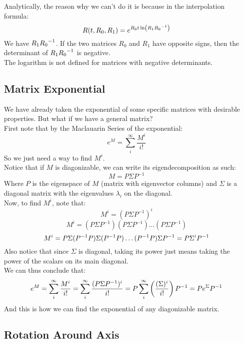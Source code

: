 \documentclass[12pt]{article}
\begin{document}
Analytically,
the reason why we can't do it is because
in the interpolation formula:
\[ R(t,R_0,R_1) = 
e^{{R_0t\ln\left( {R_1}{R_0}^{-1} \right)}} \]
We have ${R_1}{R_0}^{-1}$.
If the two matrices $R_0$ and $R_1$ have opposite
signs, then the determinant of ${R_1}{R_0}^{-1}$
is negative. \\
The logarithm is not defined for matrices
with negative determinants. \\

\newpage

\subsection*{Matrix Exponential}

We have already taken the exponential of some
specific matrices with desirable properties. 
But what if we have a general matrix? \\

First note that by the Maclauarin Series
of the exponential:
\[ e^{M} = \sum_i^\infty \dfrac{M^i}{i!} \]
So we just need a way to find $M^i$. \\

Notice that if $M$ is diagonizable,
we can write its eigendecomposition as such:
\[ M = P\Sigma P^{-1} \]
Where $P$ is the eigenspace of $M$
(matrix with eigenvector columns)
and $\Sigma$ is a diagonal matrix
with the eigenvalues $\lambda_i$
on the diagonal. \\

Now, to find $M^i$, note that:
\[ M^i = (P\Sigma P^{-1})^i \]
\[ M^i = (P\Sigma P^{-1})(P\Sigma P^{-1})\dots
(P\Sigma P^{-1})\]
\[ M^i = P\Sigma (P^{-1}P)\Sigma (P^{-1}P) \dots
(P^{-1}P)\Sigma P^{-1} = P\Sigma^i P^{-1} \]
Also notice that since $\Sigma$
is diagonal, taking its power just means
taking the power of the scalars on its main
diagonal. \\

We can thus conclude that:
\[ e^{M} = \sum_i^\infty \dfrac{M^i}{i!} 
= \sum_i^\infty \dfrac{(P\Sigma P^{-1})^i}{i!}
= P\sum_i^\infty \left( \dfrac{(\Sigma)^i}{i!} \right) P^{-1}
= Pe^{\Sigma}P^{-1} \]
And this is how we can find the exponential
of any diagonizable matrix. \\

\newpage

\subsection*{Rotation Around Axis}
\end{document}
